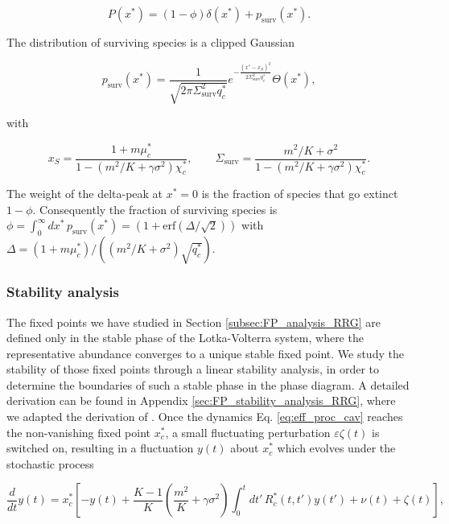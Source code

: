 \documentclass[
    preprint,
    linenumbers,
    amsmath,amssymb,amsfonts,
    aps, physrev,
    superscriptaddress,
    10pt,
    bibnotes
    ]{revtex4-2}
\begin{document}
\begin{equation}
P(x^{*})=(1-\phi)\delta(x^{*})+p_{\text{surv}}(x^{*}).
\end{equation}

The distribution of surviving species is a clipped Gaussian

\begin{equation}
p_{\text{surv}}(x^{*})=\frac{1}{\sqrt{2\pi\Sigma_{\text{surv}}^{2}q_{c}^{*}}}e^{-\frac{(x^{*}-x_{S})^{2}}{2\Sigma_{\text{surv}}^{2}q_{c}^{*}}}\Theta(x^{*}),
\end{equation}

with 

\begin{equation}
x_{S}=\frac{1+m\mu_{c}^{*}}{1-\left(m^{2}/K+\gamma\sigma^{2}\right)\chi_{c}^{*}},\qquad\Sigma_{\text{surv}}=\frac{m^{2}/K+\sigma^{2}}{1-\left(m^{2}/K+\gamma\sigma^{2}\right)\chi_{c}^{*}}.
\end{equation}

The weight of the delta-peak at $x^{*}=0$ is the fraction of species
that go extinct $1-\phi$. Consequently the fraction of surviving
species is $\phi=\int_{0}^{\infty}dx^{*}\,p_{\text{surv}}(x^{*})=\left(1+\text{erf}(\Delta/\sqrt{2})\right)$
with $\Delta=\left(1+m\mu_{c}^{*}\right)/\left((m^{2}/K+\sigma^{2})\sqrt{q_{c}^{*}}\right)$.

\subsubsection{Stability analysis}

The fixed points we have studied in Section \ref{subsec:FP_analysis_RRG}
are defined only in the stable phase of the Lotka-Volterra system,
where the representative abundance converges to a unique stable fixed
point. We study the stability of those fixed points through a linear
stability analysis, in order to determine the boundaries of such a
stable phase in the phase diagram. A detailed derivation can be found
in Appendix \ref{sec:FP_stability_analysis_RRG}, where we adapted
the derivation of \cite{opperPhaseTransition11992,gallaDynamicallyEvolvedCommunity2018}.
Once the dynamics Eq. \eqref{eq:eff_proc_cav} reaches the non-vanishing
fixed point $x_{c}^{*}$, a small fluctuating perturbation $\varepsilon\zeta(t)$
is switched on, resulting in a fluctuation $y(t)$ about $x_{c}^{*}$
which evolves under the stochastic process

\begin{equation}
\frac{d}{dt}y(t)=x_{c}^{*}\left[-y(t)+\frac{K-1}{K}\left(\frac{m^{2}}{K}+\gamma\sigma^{2}\right)\int_{0}^{t}dt'\,R_{c}^{*}(t,t')y(t')+\nu(t)+\zeta(t)\right],\label{eq:stability_analysis_eq}
\end{equation}
\end{document}
